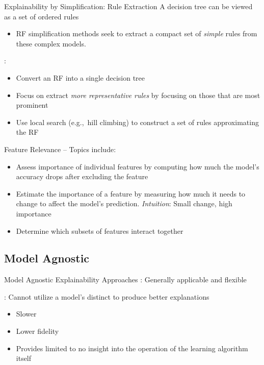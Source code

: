 \documentclass[11pt,dvipsnames,usenames,aspectratio=169]{beamer}  %
\begin{document}
\begin{frame}{Explainability by Simplification: Rule Extraction}
  A decision tree can be viewed as a set of ordered rules
  \begin{itemize}
    \item RF simplification methods seek to extract a compact set of \textit{simple} rules from these complex models.
  \end{itemize}

  \vspace{16pt}
  \noindent
  :
  \begin{itemize}
    \setlength{\itemsep}{10pt}
    \item Convert an RF into a single decision tree
    \item Focus on extract \textit{more representative rules} by focusing on those that are most prominent
    \item Use local search (e.g.,~hill climbing) to construct a set of rules approximating the RF
  \end{itemize}
\end{frame}

\begin{frame}{Feature Relevance}
   -- Topics include:
  \begin{itemize}
    \setlength{\itemsep}{15pt}
    \item Assess importance of individual features by computing how much the model's accuracy drops after excluding the feature
    \item Estimate the importance of a feature by measuring how much it needs to change to affect the model's prediction.  \textit{Intuition}: Small change, high importance
    \item Determine which subsets of features interact together
  \end{itemize}
\end{frame}

\subsection{Model Agnostic}

\begin{frame}{Model Agnostic Explainability Approaches}
  \textbf{}: Generally applicable and flexible

  \vspace{18pt}
  \textbf{}: Cannot utilize a model's distinct to produce better explanations
  \begin{itemize}
    \item Slower
    \item Lower fidelity
    \item Provides limited to no insight into the operation of the learning algorithm itself
  \end{itemize}
\end{frame}
\end{document}
